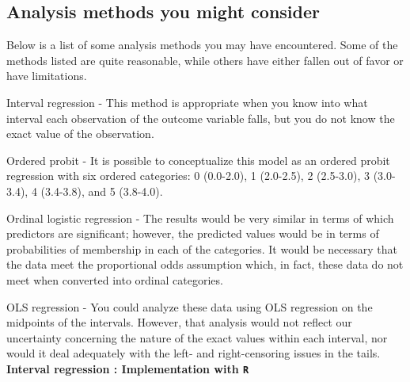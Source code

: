 \documentclass[a4paper,12pt]{article}
\begin{document}

\subsection{Analysis methods you might consider}

Below is a list of some analysis methods you may have encountered. Some of the methods listed are quite reasonable, while others have either fallen out of favor or have limitations.

Interval regression - This method is appropriate when you know into what interval each observation of the outcome variable falls, but you do not know the exact value of the observation.

Ordered probit - It is possible to conceptualize this model as an ordered probit regression with six ordered categories: 0 (0.0-2.0), 1 (2.0-2.5), 2 (2.5-3.0), 3 (3.0-3.4), 4 (3.4-3.8), and 5 (3.8-4.0).

Ordinal logistic regression - The results would be very similar in terms of which predictors are significant; however, the predicted values would be in terms of probabilities of membership in each of the categories. It would be necessary that the data meet the proportional odds assumption which, in fact, these data do not meet when converted into ordinal categories.

OLS regression - You could analyze these data using OLS regression on the midpoints of the intervals. However, that analysis would not reflect our uncertainty concerning the nature of the exact values within each interval, nor would it deal adequately with the left- and right-censoring issues in the tails.\\
\bigskip
\noindent \textbf{Interval regression : Implementation with \texttt{R}}
\end{document}

